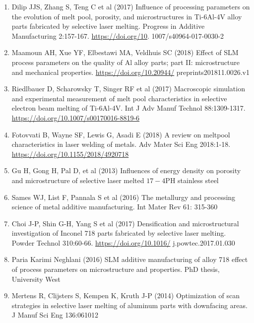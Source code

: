 \documentclass[10pt]{article}
\begin{document}
\begin{enumerate}
  \item Dilip JJS, Zhang S, Teng C et al (2017) Influence of processing parameters on the evolution of melt pool, porosity, and microstructures in Ti-6Al-4V alloy parts fabricated by selective laser melting. Progress in Additive Manufacturing 2:157-167. \href{https://doi.org/10}{https://doi.org/10}. 1007/s40964-017-0030-2

  \item Maamoun AH, Xue YF, Elbestawi MA, Veldhuis SC (2018) Effect of SLM process parameters on the quality of $\mathrm{Al}$ alloy parts; part II: microstructure and mechanical properties. \href{https://doi.org/10.20944/}{https://doi.org/10.20944/} preprints201811.0026.v1

  \item Riedlbauer D, Scharowsky T, Singer RF et al (2017) Macroscopic simulation and experimental measurement of melt pool characteristics in selective electron beam melting of Ti-6Al-4V. Int J Adv Manuf Technol 88:1309-1317. \href{https://doi.org/10.1007/s00170016-8819-6}{https://doi.org/10.1007/s00170016-8819-6}

  \item Fotovvati B, Wayne SF, Lewis G, Asadi E (2018) A review on meltpool characteristics in laser welding of metals. Adv Mater Sci Eng 2018:1-18. \href{https://doi.org/10.1155/2018/4920718}{https://doi.org/10.1155/2018/4920718}

  \item Gu H, Gong H, Pal D, et al (2013) Influences of energy density on porosity and microstructure of selective laser melted $17-4 \mathrm{PH}$ stainless steel

  \item Sames WJ, List F, Pannala S et al (2016) The metallurgy and processing science of metal additive manufacturing. Int Mater Rev 61: 315-360

  \item Choi J-P, Shin G-H, Yang S et al (2017) Densification and microstructural investigation of Inconel 718 parts fabricated by selective laser melting. Powder Technol 310:60-66. \href{https://doi.org/10.1016/}{https://doi.org/10.1016/} j.powtec.2017.01.030

  \item Paria Karimi Neghlani (2016) SLM additive manufacturing of alloy 718 effect of process parameters on microstructure and properties. $\mathrm{PhD}$ thesis, University West

  \item Mertens R, Clijsters S, Kempen K, Kruth J-P (2014) Optimization of scan strategies in selective laser melting of aluminum parts with downfacing areas. J Manuf Sci Eng 136:061012


\end{enumerate}
\end{document}
